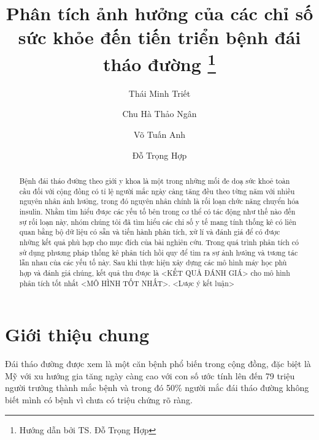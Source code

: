 \documentclass[runningheads]{llncs}
\begin{document}
%
\title{Phân tích ảnh hưởng của các chỉ số sức khỏe đến tiến triển bệnh đái tháo đường \thanks{Hướng dẫn bởi TS. Đỗ Trọng Hợp}}
%
%
\author{Thái Minh Triết \and
Chu Hà Thảo Ngân \and
Võ Tuấn Anh \and
Đỗ Trọng Hợp
}
%
%

%
\maketitle              %
%
\begin{abstract}
Bệnh đái tháo đường theo giới y khoa là một trong những mối đe doạ sức khoẻ toàn cầu đối với cộng đồng có tỉ lệ người mắc ngày càng tăng đều theo từng năm với nhiều nguyên nhân ảnh hưởng, trong đó nguyên nhân chính là rối loạn chức năng chuyển hóa insulin. Nhằm tìm hiểu được các yếu tố bên trong cơ thể có tác động như thế nào đến sự rối loạn này, nhóm chúng tôi đã tìm hiểu các chỉ số y tế mang tính thống kê có liên quan bằng bộ dữ liệu có sẵn và tiến hành phân tích, xử lí và đánh giá để có được những kết quả phù hợp cho mục đích của bài nghiên cứu. Trong quá trình phân tích có sử dụng phương pháp thống kê phân tích hồi quy để tìm ra sự ảnh hưởng và tương tác lẫn nhau của các yếu tố này. Sau khi thực hiện xây dựng các mô hình máy học phù hợp và đánh giá chúng, kết quả thu được là <KẾT QUẢ ĐÁNH GIÁ> cho mô hình phân tích tốt nhất <MÔ HÌNH TỐT NHẤT>. <Lược ý kết luận>

\end{abstract}
%
%
%
\section{Giới thiệu chung}

Đái tháo đường được xem là một căn bệnh phổ biến trong cộng đồng, đặc biệt là Mỹ với xu hướng gia tăng ngày càng cao với con số ước tính lên đến 79 triệu người trưởng thành mắc bệnh và trong đó 50\% người mắc đái tháo đường không biết mình có bệnh vì chưa có triệu chứng rõ ràng. 
\end{document}
